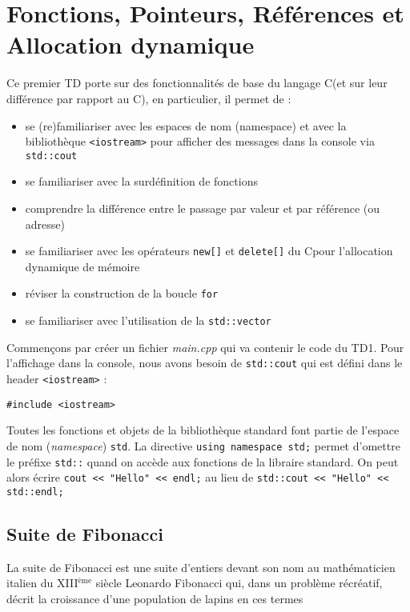 \documentclass{book}
\newcommand{\inline}[1]{\texttt{#1}}
\newcommand{\cc}{\mbox{C}}
\newcommand{\cpp}{\mbox{C\vspace{.5em}\protect\raisebox{.2ex}{\footnotesize++~}}}
\def\filename{\emph}
\begin{document}
  
\chapter{Fonctions, Pointeurs, Références et Allocation dynamique}


Ce premier TD porte sur des fonctionnalités de base du langage \cpp (et sur leur différence par rapport au \cc), en particulier, il permet de :

\begin{itemize}
  \item se (re)familiariser avec les espaces de nom (namespace) et avec la bibliothèque \inline{<iostream>} pour afficher des messages dans la console via \inline{std::cout} 
  \item se familiariser avec la surdéfinition de fonctions
  \item comprendre la différence entre le passage par valeur et par référence (ou adresse)
  \item se familiariser avec les opérateurs \inline{new[]} et \inline{delete[]} du \cpp pour l'allocation dynamique de mémoire
  \item réviser la construction de la boucle \inline{for}
  \item se familiariser avec l'utilisation de la \inline{std::vector}
\end{itemize}

\vspace{1em}
Commençons par créer un fichier \filename{main.cpp} qui va contenir le code du TD1. Pour l'affichage dans la console, nous avons besoin de \inline{std::cout} qui est défini dans le header \inline{<iostream>} :
\vspace{-0.5em}
\begin{verbatim}
#include <iostream>
\end{verbatim}
\vspace{-0.5em}
Toutes les fonctions et objets de la bibliothèque standard font partie de l'espace de nom (\emph{namespace}) \inline{std}. La directive \inline{using namespace std;} permet d'omettre le préfixe \inline{std::} quand on accède aux fonctions de la libraire standard. On peut alors écrire \inline{cout << "Hello" << endl;} au lieu de \inline{std::cout << "Hello" << std::endl;}

\section{Suite de Fibonacci}

La suite de Fibonacci est une suite d'entiers devant son nom au mathématicien
italien du XIII\(^{\text{ème}}\) siècle Leonardo Fibonacci qui, dans un problème
récréatif, décrit la croissance d'une population de lapins en ces termes
\end{document}
